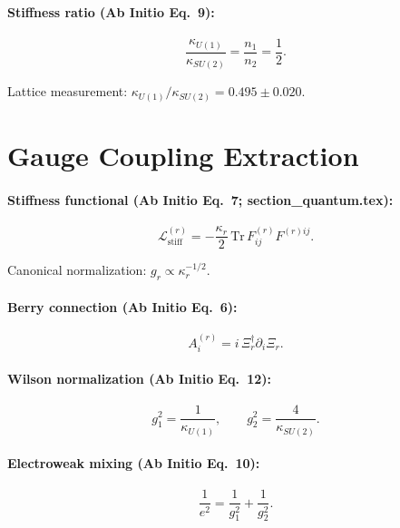 \documentclass[11pt]{article}
\begin{document}
\paragraph{Stiffness ratio (Ab Initio Eq.~9):}
\begin{equation}\tag{FST-2}
\boxed{\frac{\kappa_{U(1)}}{\kappa_{SU(2)}} = \frac{n_1}{n_2} = \frac{1}{2}.}
\end{equation}

Lattice measurement: $\kappa_{U(1)}/\kappa_{SU(2)} = 0.495 \pm 0.020$.

\section{Gauge Coupling Extraction}

\paragraph{Stiffness functional (Ab Initio Eq.~7; section\_quantum.tex):}
\begin{equation}\tag{GC-1}
\mathcal{L}^{(r)}_{\mathrm{stiff}} = -\frac{\kappa_r}{2}\,\mathrm{Tr}\,F^{(r)}_{ij}F^{(r)ij}.
\end{equation}

Canonical normalization: $g_r \propto \kappa_r^{-1/2}$.

\paragraph{Berry connection (Ab Initio Eq.~6):}
\begin{equation}\tag{GC-2}
A_i^{(r)} = i\,\Xi_r^\dagger \partial_i \Xi_r.
\end{equation}

\paragraph{Wilson normalization (Ab Initio Eq.~12):}
\begin{equation}\tag{GC-3}
g_1^2 = \frac{1}{\kappa_{U(1)}}, \qquad g_2^2 = \frac{4}{\kappa_{SU(2)}}.
\end{equation}

\paragraph{Electroweak mixing (Ab Initio Eq.~10):}
\begin{equation}\tag{GC-4}
\frac{1}{e^2} = \frac{1}{g_1^2} + \frac{1}{g_2^2}.
\end{equation}
\end{document}
